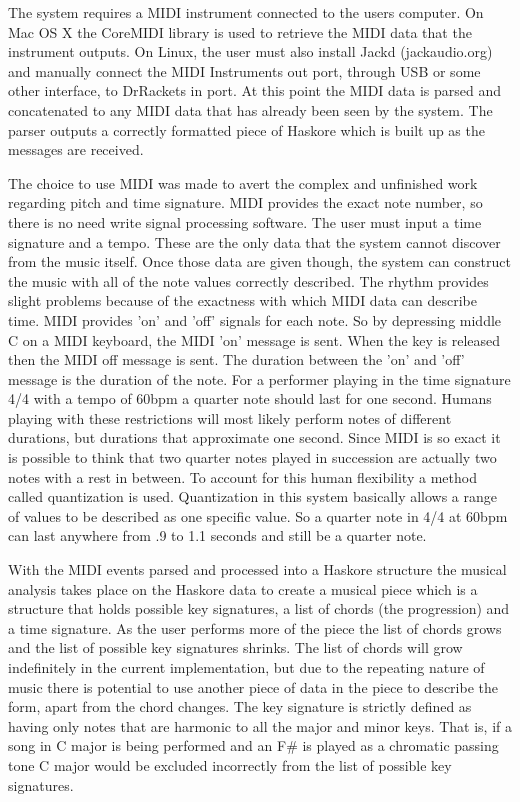 \documentclass[12pt]{ucthesis}
\begin{document}
The system requires a MIDI instrument connected to the users computer. On Mac OS X the CoreMIDI library is used to retrieve the MIDI data that the instrument outputs. On Linux, the user must also install Jackd (jackaudio.org) and manually connect the MIDI Instruments out port, through USB or some other interface, to DrRackets in port. At this point the MIDI data is parsed and concatenated to any MIDI data that has already been seen by the system. The parser outputs a correctly formatted piece of Haskore which is built up as the messages are received. 

The choice to use MIDI was made to avert the complex and unfinished work regarding pitch and time signature.  MIDI provides the exact note number, so there is no need write signal processing software. The user must input a time signature and a tempo. These are the only data that the system cannot discover from the music itself. Once those data are given though, the system can construct the music with all of the note values correctly described. The rhythm provides slight problems because of the exactness with which MIDI data can describe time. MIDI provides 'on' and 'off' signals for each note. So by depressing middle C on a MIDI keyboard, the MIDI 'on' message is sent. When the key is released then the MIDI off message is sent. The duration between the 'on' and 'off' message is the duration of the note. For a performer playing in the time signature 4/4 with a tempo of 60bpm a quarter note should last for one second. Humans playing with these restrictions will most likely perform notes of different durations, but durations that approximate one second. Since MIDI is so exact it is possible to think that two quarter notes played in succession are actually two notes with a rest in between. To account for this human flexibility a method called quantization is used. Quantization in this system basically allows a range of values to be described as one specific value. So a quarter note in 4/4 at 60bpm can last anywhere from .9 to 1.1 seconds and still be a quarter note. 

With the MIDI events parsed and processed into a Haskore structure the musical analysis takes place on the Haskore data to create a musical piece which is a structure that holds possible key signatures, a list of chords (the progression) and a time signature. As the user performs more of the piece the list of chords grows and the list of possible key signatures shrinks. The list of chords will grow indefinitely in the current implementation, but due to the repeating nature of music there is potential to use another piece of data in the piece to describe the form, apart from the chord changes. The key signature is strictly defined as having only notes that are harmonic to all the major and minor keys. That is, if a song in C major is being performed and an F\# is played as a chromatic passing tone C major would be excluded incorrectly from the list of possible key signatures. 
\end{document}
